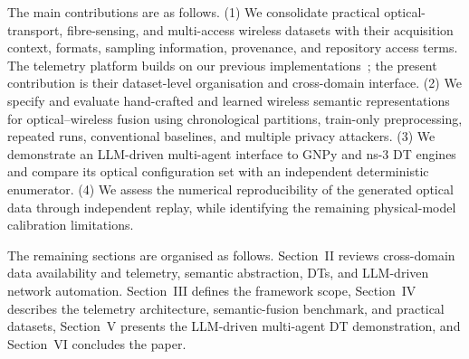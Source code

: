 \documentclass[9pt,twocolumn,twoside]{osajnl}
\begin{document}
The main contributions are as follows. (1) We consolidate practical optical-transport, fibre-sensing, and multi-access wireless datasets with their acquisition context, formats, sampling information, provenance, and repository access terms. The telemetry platform builds on our previous implementations~\cite{shen2025telemetry,Shen2026OFCdata}; the present contribution is their dataset-level organisation and cross-domain interface. (2) We specify and evaluate hand-crafted and learned wireless semantic representations for optical--wireless fusion using chronological partitions, train-only preprocessing, repeated runs, conventional baselines, and multiple privacy attackers. (3) We demonstrate an LLM-driven multi-agent interface to GNPy and ns-3 DT engines and compare its optical configuration set with an independent deterministic enumerator. (4) We assess the numerical reproducibility of the generated optical data through independent replay, while identifying the remaining physical-model calibration limitations.

The remaining sections are organised as follows. Section~II reviews cross-domain data availability and telemetry, semantic abstraction, DTs, and LLM-driven network automation. Section~III defines the framework scope, Section~IV describes the telemetry architecture, semantic-fusion benchmark, and practical datasets, Section~V presents the LLM-driven multi-agent DT demonstration, and Section~VI concludes the paper.


\end{document}
